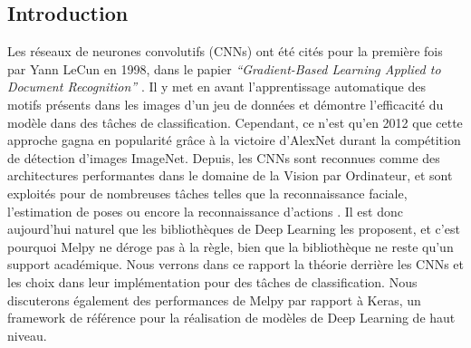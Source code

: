 \begin{multicols}{2}
\tableofcontents
\section{Introduction}
Les réseaux de neurones convolutifs (CNNs) ont été cités pour 
la première fois par Yann LeCun en 1998, dans le papier 
\textit{“Gradient-Based Learning Applied to Document Recognition”} \cite{YannLeCunCNNs}.
Il y met en avant l’apprentissage automatique des motifs présents dans les 
images d’un jeu de données et démontre l’efficacité du modèle dans des tâches
de classification. Cependant, ce n’est qu’en 2012 que cette approche 
gagna en popularité grâce à la victoire d’AlexNet\cite{AlexNet} durant la 
compétition de détection d’images ImageNet. Depuis, les CNNs sont reconnues 
comme des architectures performantes dans le domaine de la Vision par Ordinateur, 
et sont exploités pour de nombreuses tâches telles que la reconnaissance 
faciale, l’estimation de poses ou encore la reconnaissance d’actions 
\cite{ApplicationsOfCNNs}. Il est donc aujourd’hui naturel que les bibliothèques 
de Deep Learning les proposent, et c’est pourquoi Melpy ne déroge pas à la 
règle, bien que la bibliothèque ne reste qu'un support académique. Nous verrons dans 
ce rapport la théorie derrière les CNNs et les choix 
dans leur implémentation pour des tâches de classification. Nous discuterons 
également des performances de Melpy par rapport à Keras, un framework de 
référence pour la réalisation de modèles de Deep Learning de haut niveau.
\end{multicols}